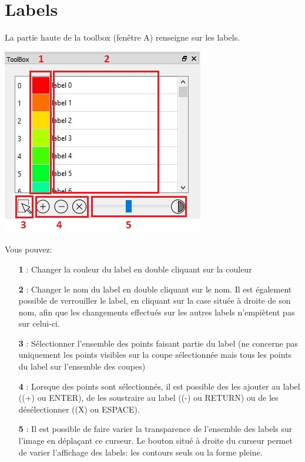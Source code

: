 \documentclass {article}
\begin{document}
\section{Labels}

La partie haute de la toolbox (fenêtre A) renseigne sur les labels. 

\begin{center}
		\includegraphics{Iconographie/toolbox_A}
\end{center}


Vous pouvez:
\begin{itemize}
	\item[\textbf{1}]: Changer la couleur du label en double cliquant sur la couleur
	\item[\textbf{2}]: Changer le nom du label en double cliquant sur le nom.  Il est également possible de verrouiller le label, en cliquant sur la case située à droite de son nom, afin que les changements effectués sur les autres labels n'empiètent pas sur celui-ci.
	\item[\textbf{3}]: Sélectionner l'ensemble des points faisant partie du label (ne concerne pas uniquement les points visibles sur la coupe sélectionnée mais tous les points du label sur l'ensemble des coupes)
	\item[\textbf{4}]: Lorsque des points sont sélectionnés, il est possible des les ajouter au label ((+) ou ENTER), de les soustraire au label ((-) ou RETURN) ou de les désélectionner ((X) ou ESPACE).
	\item[\textbf{5}]: Il est possible de faire varier la transparence de l'ensemble des labels sur l'image en déplaçant ce curseur. Le bouton situé à droite du curseur permet de varier l'affichage des labels: les contours seuls ou la forme pleine.
\end{itemize}
\end{document}

